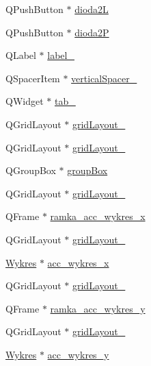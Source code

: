 \begin{DoxyCompactItemize}
\item 
Q\+Push\+Button $\ast$ \hyperlink{class_ui___main_window_ae00d799daf0fd5b1902d0d0ec478ce16}{dioda2L}
\item 
Q\+Push\+Button $\ast$ \hyperlink{class_ui___main_window_afe9b39912121a0866be63b69db2d56f1}{dioda2P}
\item 
Q\+Label $\ast$ \hyperlink{class_ui___main_window_a13936e6f18b1c90402b3c7a3c92b6cdb}{label\+\_}
\item 
Q\+Spacer\+Item $\ast$ \hyperlink{class_ui___main_window_a9d4bfb2fa0d87ccf9f7a311116676be6}{vertical\+Spacer\+\_}
\item 
Q\+Widget $\ast$ \hyperlink{class_ui___main_window_a41c7e77dd12b9445e13dbe8fb5ae1488}{tab\+\_}
\item 
Q\+Grid\+Layout $\ast$ \hyperlink{class_ui___main_window_a20728ed83bf740332bd908ea3e15ace6}{grid\+Layout\+\_}
\item 
Q\+Grid\+Layout $\ast$ \hyperlink{class_ui___main_window_a8ee86315639f324b17708efc7dbe8b19}{grid\+Layout\+\_}
\item 
Q\+Group\+Box $\ast$ \hyperlink{class_ui___main_window_aef7cb3be8cecfc9aaf98f036a98781ce}{group\+Box}
\item 
Q\+Grid\+Layout $\ast$ \hyperlink{class_ui___main_window_a3bf4c0bcc647f9c217e7bdc21a07a68e}{grid\+Layout\+\_}
\item 
Q\+Frame $\ast$ \hyperlink{class_ui___main_window_aac25544d152a81720ca64be30e5bd40f}{ramka\+\_\+acc\+\_\+wykres\+\_\+x}
\item 
Q\+Grid\+Layout $\ast$ \hyperlink{class_ui___main_window_a82afa72f635e4e544be2e289ef53de9f}{grid\+Layout\+\_}
\item 
\hyperlink{class_wykres}{Wykres} $\ast$ \hyperlink{class_ui___main_window_a0c90f06928ad144d9e8b8935ed285b69}{acc\+\_\+wykres\+\_\+x}
\item 
Q\+Grid\+Layout $\ast$ \hyperlink{class_ui___main_window_a4495f53e7dd496615426ada2042c051b}{grid\+Layout\+\_}
\item 
Q\+Frame $\ast$ \hyperlink{class_ui___main_window_af1a4bc3506f6263cf69c3bc434e7b353}{ramka\+\_\+acc\+\_\+wykres\+\_\+y}
\item 
Q\+Grid\+Layout $\ast$ \hyperlink{class_ui___main_window_afb7c4d53d123b3a3a949a5cc221c6b90}{grid\+Layout\+\_}
\item 
\hyperlink{class_wykres}{Wykres} $\ast$ \hyperlink{class_ui___main_window_ab53418042651aedd2c4e1832be7af1d8}{acc\+\_\+wykres\+\_\+y}
\item 

\end{DoxyCompactItemize}
